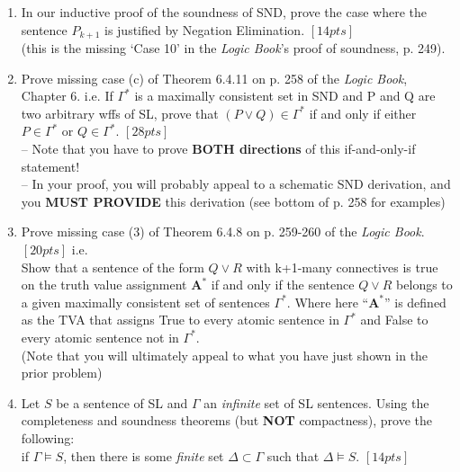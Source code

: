 \documentclass[12pt]{article}
\begin{document}
\begin{enumerate}


\item In our inductive proof of the soundness of SND, prove the case where the sentence $P_{k+1}$ is justified by Negation Elimination. $[14pts]$ \\ (this is the missing `Case 10' in the \textit{Logic Book}'s proof of soundness, p. 249). \\


\item Prove missing case (c) of Theorem 6.4.11 on p. 258 of the \textit{Logic Book}, Chapter 6. i.e. If $\Gamma^{\ast}$ is a maximally consistent set in SND and P and Q are two arbitrary wffs of SL, prove that $(P \lor Q) \in \Gamma^{\ast}$ if and only if either $P \in \Gamma^{\ast}$ or $Q \in \Gamma^{\ast}$. $[28pts]$ \\ -- Note that you have to prove \textbf{BOTH directions} of this if-and-only-if statement!  \\ -- In your proof, you will probably appeal to a schematic SND derivation, and you \textbf{MUST PROVIDE} this derivation (see bottom of p. 258 for examples) \\

\item Prove missing case (3) of Theorem 6.4.8 on p. 259-260 of the \textit{Logic Book}. $[20pts]$ i.e. \\ Show that a sentence of the form $Q \lor R$ with k+1-many connectives is true on the truth value assignment $\mathbf{A}^{\ast}$ if and only if the sentence $Q \lor R$ belongs to a given maximally consistent set of sentences $\Gamma^{\ast}$. Where here ``$\mathbf{A}^{\ast}$'' is defined as the TVA that assigns True to every atomic sentence in $\Gamma^{\ast}$ and False to every atomic sentence not in $\Gamma^{\ast}$. \\ (Note that you will ultimately appeal to what you have just shown in the prior problem) \\

\item Let $S$ be a sentence of SL and $\Gamma$ an \textit{infinite} set of SL sentences. Using the completeness and soundness theorems (but \textbf{NOT} compactness), prove the following: \\ if $\Gamma \vDash S$, then there is some {\it{finite}} set $\Delta \subset \Gamma$ such that $\Delta \vDash S$. $[14pts]$\\


\end{enumerate}
\end{document}
